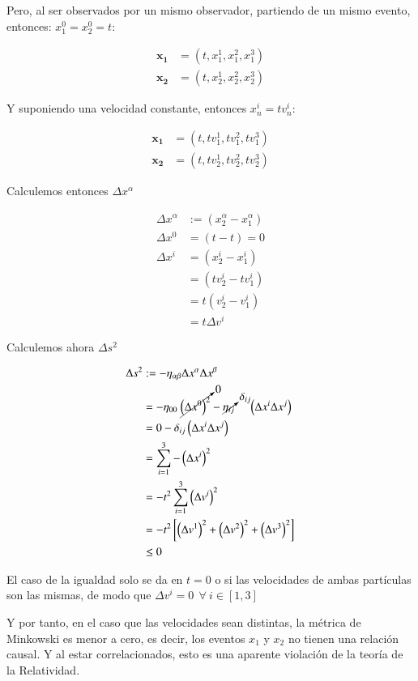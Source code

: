 Pero, al ser observados por un mismo observador, partiendo de un mismo evento, entonces: $x^0_1=x^0_2=t$:

\begin{align*}
    \mathbf{x_1} &= \left(t,x^1_1,x^2_1,x^3_1\right)\\
    \mathbf{x_2} &= \left(t,x^1_2,x^2_2,x^3_2\right)
\end{align*}

Y suponiendo una velocidad constante, entonces $x^i_n=tv^i_n$:

\begin{align}
    \mathbf{x_1} &= \left(t,tv^1_1,tv^2_1,tv^3_1\right)\\
    \mathbf{x_2} &= \left(t,tv^1_2,tv^2_2,tv^3_2\right)
\end{align}

Calculemos entonces $\Delta x^\alpha$

\begin{align*}
    \Delta x^\alpha 
        &:= \left(x^\alpha_2-x^\alpha_1\right)\\
    \Delta x^0
        &= \left(t-t\right)=0\\
    \Delta x^i
        &= \left(x^i_2-x^i_1\right)\\
        &= \left(tv^i_2-tv^i_1\right)\\
        &= t\left(v^i_2-v^i_1\right)\\
        &= t\Delta v^i
\end{align*}

Calculemos ahora $\Delta s^2$

\begin{align*}
    \Delta s^2 
        &:= -\eta_{\alpha\beta}\Delta x^\alpha \Delta x^\beta\\
        &=-\eta_{00}~\cancelto{0}{\left(\Delta x^0\right)^2}-\cancelto{\delta_{ij}}{\eta_{ij}}~~~~~\left(\Delta x^i\Delta x^j\right)\\
        &=0-\delta_{ij}\left(\Delta x^i\Delta x^j \right)\\
        &=\sum_{i=1}^3-\left(\Delta x^i\right)^2\\
        &=-t^2\sum_{i=1}^3 \left(\Delta v^i\right)^2\\
        &=-t^2\left[\left(\Delta v^1\right)^2+\left(\Delta v^2\right)^2+\left(\Delta v^3\right)^2\right]\\
        &\leq0
\end{align*}

El caso de la igualdad solo se da en $t=0$ o si las velocidades de ambas partículas son las mismas, de modo que $\Delta v^i = 0~~\forall~i\in[1,3]$

Y por tanto, en el caso que las velocidades sean distintas, la métrica de Minkowski es menor a cero, es decir, los eventos $x_1$ y $x_2$ no tienen una relación causal. Y al estar correlacionados, esto es una aparente violación de la teoría de la Relatividad.

